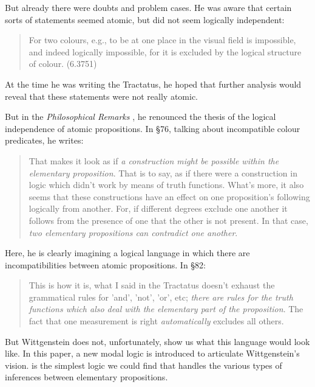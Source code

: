 But already there were doubts and problem cases.  He was aware that
certain sorts of statements seemed atomic, but did not seem logically
independent:

\begin{quote}
  For two colours, e.g., to be at one place in the visual field is
  impossible, and indeed logically impossible, for it is excluded by
  the logical structure of colour. (6.3751)
\end{quote}

\NI At the time he was writing the Tractatus, he hoped that further
analysis would reveal that these statements were not really atomic.

But in the \emph{Philosophical Remarks} \cite{wittgenstein-remarks}, he
renounced the thesis of the logical independence of atomic
propositions.  In \S 76, talking about incompatible colour predicates,
he writes:

\begin{quote}
  That makes it look as if \emph{a construction might be possible
    within the elementary proposition}. That is to say, as if there
  were a construction in logic which didn't work by means of truth
  functions.  What's more, it also seems that these constructions have
  an effect on one proposition's following logically from another.
  For, if different degrees exclude one another it follows from the
  presence of one that the other is not present.  In that case,
  \emph{two elementary propositions can contradict one another}.
\end{quote}

\NI Here, he is clearly imagining a logical language in which there
are incompatibilities between atomic propositions. In \S 82:

\begin{quote}
  This is how it is, what I said in the Tractatus doesn't exhaust the
  grammatical rules for 'and', 'not', 'or', etc; \emph{there are rules
    for the truth functions which also deal with the elementary part
    of the proposition}.  The fact that one measurement is right
  \emph{automatically} excludes all others.
\end{quote}

\NI But Wittgenstein does not, unfortunately, show us what this
language would look like.  In this paper, a new modal logic is
introduced to articulate Wittgenstein's vision.  \ELFULL{} is the simplest logic we could find that handles the various types of inferences between elementary propositions.

